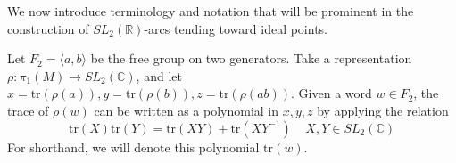 \documentclass{article}
\theoremstyle{plain}
\theoremstyle{definition}
\theoremstyle{plain}
\theoremstyle{plain}
\theoremstyle{plain}
\newtheorem{lemma}[theorem]{Lemma}
\theoremstyle{remark}
\theoremstyle{remark}
\theoremstyle{plain}
\theoremstyle{plain}
\begin{document}
%

%

We now introduce terminology and notation that will be prominent in the construction of $SL_2(\mathbb{R})$-arcs tending toward ideal points. 

\medskip

Let $F_2 = \langle a, b \rangle$ be the free group on two generators. Take a representation $\rho: \pi_1(M) \to SL_2(\mathbb{C})$, and let $x = \text{tr}(\rho(a)), y = \text{tr}(\rho(b)), z = \text{tr}(\rho(ab))$. Given a word $w \in F_2$, the trace of $\rho(w)$ can be written as a polynomial in $x, y, z$ by applying the relation
\begin{equation}
	\text{tr}(X)\text{tr}(Y) = \text{tr}(XY) + \text{tr}(XY^{-1}) \ \ \ \ \ X, Y \in SL_2(\mathbb{C})
\end{equation}
For shorthand, we will denote this polynomial $\text{tr}(w)$. 
\end{document}
